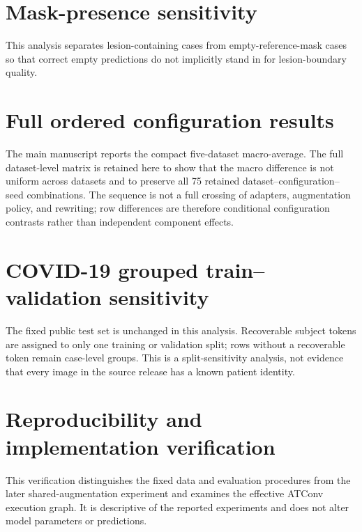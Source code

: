 \documentclass[pdflatex,sn-vancouver-num,referee,lineno]{sn-jnl}
\begin{document}


\section*{Mask-presence sensitivity}
This analysis separates lesion-containing cases from empty-reference-mask cases
so that correct empty predictions do not implicitly stand in for lesion-boundary
quality.



\section*{Full ordered configuration results}
The main manuscript reports the compact five-dataset macro-average. The full
dataset-level matrix is retained here to show that the macro difference is not
uniform across datasets and to preserve all 75 retained
dataset--configuration--seed combinations. The sequence is not a full
crossing of adapters, augmentation policy, and rewriting; row differences are therefore
conditional configuration contrasts rather than independent component effects.



\section*{COVID-19 grouped train--validation sensitivity}
The fixed public test set is unchanged in this analysis. Recoverable subject
tokens are assigned to only one training or validation split; rows without a
recoverable token remain case-level groups. This is a split-sensitivity analysis,
not evidence that every image in the source release has a known patient identity.


\FloatBarrier

\section*{Reproducibility and implementation verification}
This verification distinguishes the fixed data and evaluation procedures from
the later shared-augmentation experiment and examines the effective ATConv
execution graph. It is descriptive of the reported experiments and does not
alter model parameters or predictions.
\end{document}
